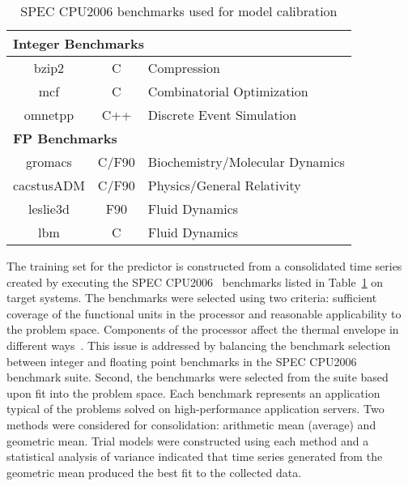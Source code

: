 \begin{table}[t!]
  \centering
  \caption{SPEC CPU2006 benchmarks used for model calibration}
  \label{tab:specbenchs}
  \begin{tabular}{c c p{5cm}}
    \hline
    \multicolumn{3}{l}{\textbf{Integer Benchmarks}} \\
    \hline
    bzip2&C&Compression\\
    mcf&C&Combinatorial Optimization\\
    omnetpp&C++&Discrete Event Simulation\\
    \multicolumn{3}{l}{\textbf{FP Benchmarks}} \\
    \hline
    gromacs&C/F90&Biochemistry/Molecular Dynamics\\
    cacstusADM&C/F90&Physics/General Relativity\\
    leslie3d&F90&Fluid Dynamics\\
    lbm&C&Fluid Dynamics\\
    \hline
  \end{tabular}
\end{table}
The training set for the predictor is constructed from a consolidated
time series created by executing the SPEC CPU2006~\cite{spec2006}
benchmarks listed in Table~\ref{tab:specbenchs} on target systems.  The
benchmarks were selected using two criteria: sufficient coverage of the
functional units in the processor and reasonable applicability to the
problem space.  Components of the processor affect the thermal envelope
in different ways~\cite{Kumar2008}.  This issue is addressed by
balancing the benchmark selection between integer and floating point
benchmarks in the SPEC CPU2006 benchmark suite.  Second, the benchmarks
were selected from the suite based upon fit into the problem space.
Each benchmark represents an application typical of the problems solved
on high-performance application servers.  Two methods were considered
for consolidation: arithmetic mean (average) and geometric mean.  Trial
models were constructed using each method and a statistical analysis of
variance indicated that time series generated from the geometric mean
produced the best fit to the collected data.

